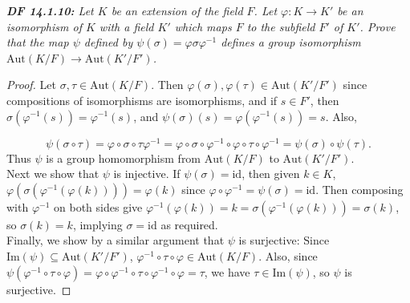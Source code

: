 \documentclass{article}
\begin{document}
\it \textbf{DF 14.1.10:} Let $K$ be an extension of the field $F$. Let
  $\varphi:K\rightarrow K'$ be an isomorphism of $K$ with a field $K'$
  which maps $F$ to the subfield $F'$ of $K'$. Prove that the map $\psi$
  defined by $\psi(\sigma) =\varphi\sigma\varphi^{-1}$ defines a group
  isomorphism $\text{Aut}(K/F)\rightarrow\text{Aut}(K'/F')$. 

  \begin{proof}
    Let $\sigma,\tau\in\text{Aut}(K/F)$. Then
    $\varphi(\sigma),\varphi(\tau) \in\text{Aut}(K'/F')$ since compositions
    of isomorphisms are isomorphisms, and if $s\in F'$, then
    $\sigma(\varphi^{-1}(s))=\varphi^{-1}(s)$, and
    $\psi(\sigma)(s)=\varphi(\varphi^{-1}(s))=s$. Also,

    \[\psi(\sigma\circ\tau) =\varphi\circ\sigma\circ\tau\varphi^{-1}
    =\varphi\circ\sigma\circ\varphi^{-1}
    \circ\varphi\circ\tau\circ\varphi^{-1} =\psi(\sigma)\circ\psi(\tau).\]
    Thus $\psi$ is a group homomorphism from $\text{Aut}(K/F)$ to
    $\text{Aut}(K'/F')$. \\

    Next we show that $\psi$ is injective. If $\psi(\sigma)=\text{id}$,
    then given $k\in K$, $\varphi(\sigma(\varphi^{-1}(\varphi(k))))
    =\varphi(k)$ since $\varphi\circ\varphi^{-1}=\psi(\sigma) =\text{id}$.
    Then composing with $\varphi^{-1}$ on both sides give
    $\varphi^{-1}(\varphi(k)) =k=\sigma(\varphi^{-1}(\varphi(k)))
    =\sigma(k)$, so $\sigma(k)=k$, implying $\sigma=\text{id}$ as required.
    \\

    Finally, we show by a similar argument that $\psi$ is surjective: Since
    $\text{Im}(\psi) \subseteq\text{Aut}(K'/F')$,
    $\varphi^{-1}\circ\tau\circ\varphi \in\text{Aut}(K/F)$. Also, since
    $\psi(\varphi^{-1}\circ\tau\circ\varphi)
    =\varphi\circ\varphi^{-1}\circ\tau\circ\varphi^{-1}\circ\varphi =\tau$,
    we have $\tau\in\text{Im}(\psi)$, so $\psi$ is surjective.
  \end{proof}
\end{document}
